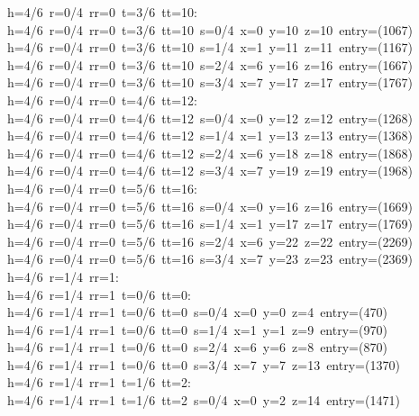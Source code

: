 \begin{tabbing}
h=4/6\ r=0/4\ rr=0\ t=3/6\ tt=10:\\[0pt]
h=4/6\ r=0/4\ rr=0\ t=3/6\ tt=10\ s=0/4\ x=0\ y=10\ z=10\ entry=(1067)\\[0pt]
h=4/6\ r=0/4\ rr=0\ t=3/6\ tt=10\ s=1/4\ x=1\ y=11\ z=11\ entry=(1167)\\[0pt]
h=4/6\ r=0/4\ rr=0\ t=3/6\ tt=10\ s=2/4\ x=6\ y=16\ z=16\ entry=(1667)\\[0pt]
h=4/6\ r=0/4\ rr=0\ t=3/6\ tt=10\ s=3/4\ x=7\ y=17\ z=17\ entry=(1767)\\[0pt]
h=4/6\ r=0/4\ rr=0\ t=4/6\ tt=12:\\[0pt]
h=4/6\ r=0/4\ rr=0\ t=4/6\ tt=12\ s=0/4\ x=0\ y=12\ z=12\ entry=(1268)\\[0pt]
h=4/6\ r=0/4\ rr=0\ t=4/6\ tt=12\ s=1/4\ x=1\ y=13\ z=13\ entry=(1368)\\[0pt]
h=4/6\ r=0/4\ rr=0\ t=4/6\ tt=12\ s=2/4\ x=6\ y=18\ z=18\ entry=(1868)\\[0pt]
h=4/6\ r=0/4\ rr=0\ t=4/6\ tt=12\ s=3/4\ x=7\ y=19\ z=19\ entry=(1968)\\[0pt]
h=4/6\ r=0/4\ rr=0\ t=5/6\ tt=16:\\[0pt]
h=4/6\ r=0/4\ rr=0\ t=5/6\ tt=16\ s=0/4\ x=0\ y=16\ z=16\ entry=(1669)\\[0pt]
h=4/6\ r=0/4\ rr=0\ t=5/6\ tt=16\ s=1/4\ x=1\ y=17\ z=17\ entry=(1769)\\[0pt]
h=4/6\ r=0/4\ rr=0\ t=5/6\ tt=16\ s=2/4\ x=6\ y=22\ z=22\ entry=(2269)\\[0pt]
h=4/6\ r=0/4\ rr=0\ t=5/6\ tt=16\ s=3/4\ x=7\ y=23\ z=23\ entry=(2369)\\[0pt]
h=4/6\ r=1/4\ rr=1:\\[0pt]
h=4/6\ r=1/4\ rr=1\ t=0/6\ tt=0:\\[0pt]
h=4/6\ r=1/4\ rr=1\ t=0/6\ tt=0\ s=0/4\ x=0\ y=0\ z=4\ entry=(470)\\[0pt]
h=4/6\ r=1/4\ rr=1\ t=0/6\ tt=0\ s=1/4\ x=1\ y=1\ z=9\ entry=(970)\\[0pt]
h=4/6\ r=1/4\ rr=1\ t=0/6\ tt=0\ s=2/4\ x=6\ y=6\ z=8\ entry=(870)\\[0pt]
h=4/6\ r=1/4\ rr=1\ t=0/6\ tt=0\ s=3/4\ x=7\ y=7\ z=13\ entry=(1370)\\[0pt]
h=4/6\ r=1/4\ rr=1\ t=1/6\ tt=2:\\[0pt]
h=4/6\ r=1/4\ rr=1\ t=1/6\ tt=2\ s=0/4\ x=0\ y=2\ z=14\ entry=(1471)\\[0pt]

\end{tabbing}
